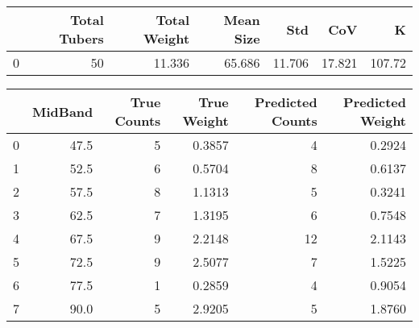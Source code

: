 \begin{tabular}{lrrrrrr}
\toprule
{} &  Total Tubers &  Total Weight &  Mean Size &     Std &     CoV &       K \\
\midrule
0 &            50 &        11.336 &     65.686 &  11.706 &  17.821 &  107.72 \\
\bottomrule
\end{tabular}

\begin{tabular}{lrrrrr}
\toprule
{} &  MidBand &  True Counts &  True Weight &  Predicted Counts &  Predicted Weight \\
\midrule
0 &     47.5 &            5 &       0.3857 &                 4 &            0.2924 \\
1 &     52.5 &            6 &       0.5704 &                 8 &            0.6137 \\
2 &     57.5 &            8 &       1.1313 &                 5 &            0.3241 \\
3 &     62.5 &            7 &       1.3195 &                 6 &            0.7548 \\
4 &     67.5 &            9 &       2.2148 &                12 &            2.1143 \\
5 &     72.5 &            9 &       2.5077 &                 7 &            1.5225 \\
6 &     77.5 &            1 &       0.2859 &                 4 &            0.9054 \\
7 &     90.0 &            5 &       2.9205 &                 5 &            1.8760 \\
\bottomrule
\end{tabular}

